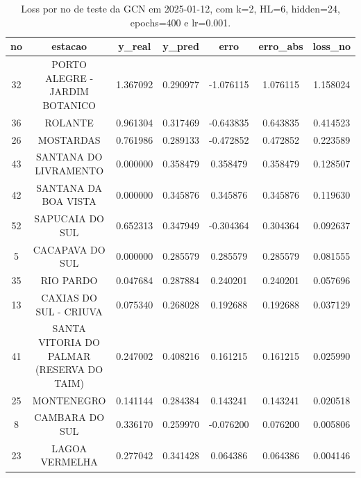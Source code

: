 \begin{table}[h]
\centering
\caption{Loss por no de teste da GCN em 2025-01-12, com k=2, HL=6, hidden=24, epochs=400 e lr=0.001.}
\label{tab:gcn_loss_k2_hl6_h24_e400_d20250112}
\begin{tabular}{ccccccc}
\toprule
no & estacao & y\_real & y\_pred & erro & erro\_abs & loss\_no \\
\midrule
32 & PORTO ALEGRE - JARDIM BOTANICO & 1.367092 & 0.290977 & -1.076115 & 1.076115 & 1.158024 \\
36 & ROLANTE & 0.961304 & 0.317469 & -0.643835 & 0.643835 & 0.414523 \\
26 & MOSTARDAS & 0.761986 & 0.289133 & -0.472852 & 0.472852 & 0.223589 \\
43 & SANTANA DO LIVRAMENTO & 0.000000 & 0.358479 & 0.358479 & 0.358479 & 0.128507 \\
42 & SANTANA DA BOA VISTA & 0.000000 & 0.345876 & 0.345876 & 0.345876 & 0.119630 \\
52 & SAPUCAIA DO SUL & 0.652313 & 0.347949 & -0.304364 & 0.304364 & 0.092637 \\
5 & CACAPAVA DO SUL & 0.000000 & 0.285579 & 0.285579 & 0.285579 & 0.081555 \\
35 & RIO PARDO & 0.047684 & 0.287884 & 0.240201 & 0.240201 & 0.057696 \\
13 & CAXIAS DO SUL - CRIUVA & 0.075340 & 0.268028 & 0.192688 & 0.192688 & 0.037129 \\
41 & SANTA VITORIA DO PALMAR (RESERVA DO TAIM) & 0.247002 & 0.408216 & 0.161215 & 0.161215 & 0.025990 \\
25 & MONTENEGRO & 0.141144 & 0.284384 & 0.143241 & 0.143241 & 0.020518 \\
8 & CAMBARA DO SUL & 0.336170 & 0.259970 & -0.076200 & 0.076200 & 0.005806 \\
23 & LAGOA VERMELHA & 0.277042 & 0.341428 & 0.064386 & 0.064386 & 0.004146 \\
\bottomrule
\end{tabular}
\end{table}
